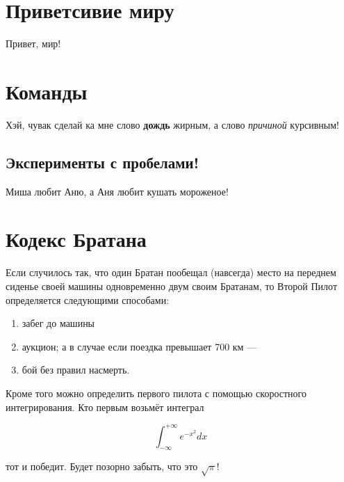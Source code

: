 \documentclass[12pt, a4paper]{article}  %
\begin{document}




\section{Приветсивие миру}
Привет, мир! 

\section{Команды}

Хэй, чувак сделай ка мне слово \textbf{дождь} жирным, а слово \textit{причиной} курсивным!

\subsection{Эксперименты с пробелами!}

Миша любит          Аню, а Аня любит      кушать мороженое! 



\section{Кодекс Братана} 

Если случилось так, что один Братан пообещал (навсегда) место на переднем сиденье своей машины одновременно двум своим Братанам, то Второй Пилот определяется следующими способами:


\begin{enumerate}
\item забег до машины
\item аукцион; а в случае если поездка превышает 700 км ---
\item бой без правил насмерть.  %
\end{enumerate}






Кроме того можно определить первого пилота с помощью скоростного интегрирования. Кто первым возьмёт интеграл 

\[ \int_{-\infty}^{+\infty} e^{-x^2} dx \] 

тот и победит. Будет позорно забыть, что это $\sqrt{\pi}$!
\end{document}
